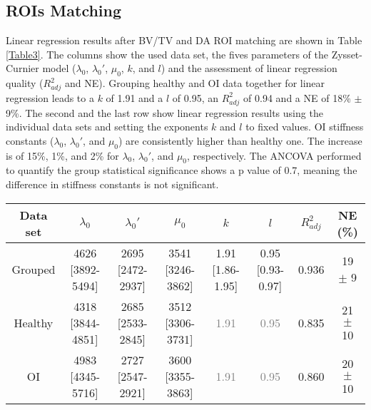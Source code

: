 \documentclass[a4paper,fleqn]{DC_ArtStyle}
\begin{document}
	\subsection{ROIs Matching}
	Linear regression results after BV/TV and DA ROI matching are shown in Table \ref{Table3}. The columns show the used data set, the fives parameters of the Zysset-Curnier model ($\lambda_0$, $\lambda_0'$, $\mu_0$, $k$, and $l$) and the assessment of linear regression quality ($R^2_{adj}$ and NE). Grouping healthy and OI data together for linear regression leads to a $k$ of 1.91 and a $l$ of 0.95, an $R^2_{adj}$ of 0.94 and a NE of 18\% $\pm$ 9\%. The second and the last row show linear regression results using the individual data sets and setting the exponents $k$ and $l$ to fixed values. OI stiffness constants ($\lambda_0$, $\lambda_0'$, and $\mu_0$) are consistently higher than healthy one. The increase is of 15\%, 1\%, and 2\% for $\lambda_0$, $\lambda_0'$, and $\mu_0$, respectively. The ANCOVA performed to quantify the group statistical significance shows a p value of 0.7, meaning the difference in stiffness constants is not significant.\\
	
	\begin{table*}[b]
		\caption{Constants obtained with BV/TV and DA matched data sets. Comparison is performed between grouped (N ROIs = 166) and separated data sets (N ROIs = 83). Values are presented as value [95\% CI] or mean $\pm$ standard deviation. Values in grey were fixed in the linear regression.}
		\label{Table3}
		\begin{tabular}{cccccccc}
			\toprule
			Data set & $\lambda_0$ & $\lambda_0'$ & $\mu_0$ & $k$ & $l$ & $R^2_{adj}$ & NE (\%) \\
			\midrule
			Grouped & 4626 [3892-5494] & 2695 [2472-2937] & 3541 [3246-3862] & 1.91 [1.86-1.95] & 0.95 [0.93-0.97] & 0.936 & 19 $\pm$ 9\\
			
			Healthy & 4318 [3844-4851] & 2685 [2533-2845] & 3512 [3306-3731] & \textcolor{gray}{1.91} & \textcolor{gray}{0.95} & 0.835 & 21 $\pm$ 10\\
			
			OI & 4983 [4345-5716] & 2727 [2547-2921] & 3600 [3355-3863] & \textcolor{gray}{1.91} & \textcolor{gray}{0.95} & 0.860 & 20 $\pm$ 10\\
			\bottomrule
		\end{tabular}
	\end{table*}
	
\end{document}
